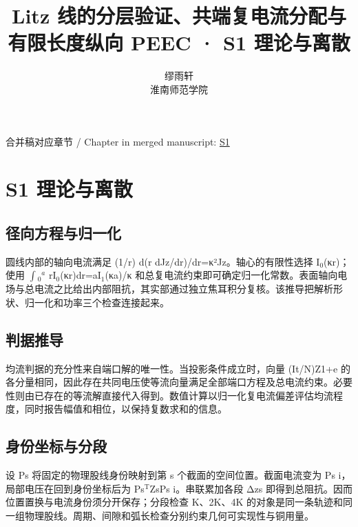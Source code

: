 \documentclass[11pt]{article}
\begin{document}
\title{Litz 线的分层验证、共端复电流分配与有限长度纵向 PEEC · S1 理论与离散}
\author{缪雨轩\\淮南师范学院}
\date{}
\maketitle
\noindent 合并稿对应章节 / Chapter in merged manuscript: \href{paper_zh-CN_single.pdf#chapter-S1}{S1}\par
\FloatBarrier
\section*{S1 理论与离散}
\hypertarget{chapter-S1}{}
\subsection*{径向方程与归一化}
\hypertarget{S1.round_derivation.heading}{}
圆线内部的轴向电流满足 (1/r) d(r dJz/dr)/dr=κ²Jz。轴心的有限性选择 I\(_0\)(κr)；使用 \(\int\)\(_0\)\(^a\) rI\(_0\)(κr)dr=aI\(_1\)(κa)/κ 和总复电流约束即可确定归一化常数。表面轴向电场与总电流之比给出内部阻抗，其实部通过独立焦耳积分复核。该推导把解析形状、归一化和功率三个检查连接起来。


\subsection*{判据推导}
\hypertarget{S1.sharing_derivation.heading}{}
均流判据的充分性来自端口解的唯一性。当投影条件成立时，向量 (It/N)Z1+e 的各分量相同，因此存在共同电压使等流向量满足全部端口方程及总电流约束。必要性则由已存在的等流解直接代入得到。数值计算以归一化复电流偏差评估均流程度，同时报告幅值和相位，以保持复数求和的信息。


\subsection*{身份坐标与分段}
\hypertarget{S1.dtm_derivation.heading}{}
设 Ps 将固定的物理股线身份映射到第 s 个截面的空间位置。截面电流变为 Ps i，局部电压在回到身份坐标后为 Ps\(^{\mathrm T}\)ZsPs i。串联累加各段 Δzs 即得到总阻抗。因而位置置换与电流身份须分开保存；分段检查 K、2K、4K 的对象是同一条轨迹和同一组物理股线。周期、间隙和弧长检查分别约束几何可实现性与铜用量。
\end{document}

